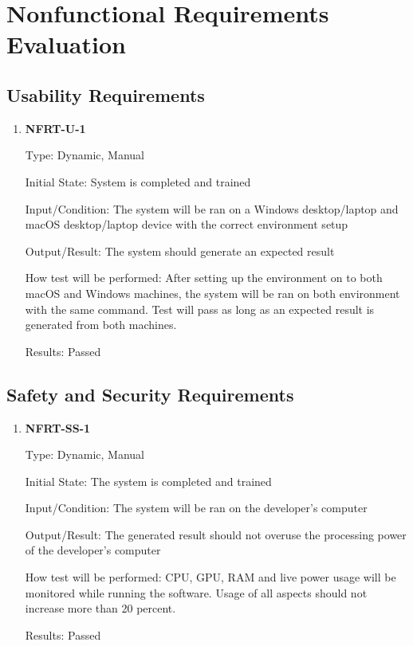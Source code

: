 \documentclass[12pt, titlepage]{article}
\begin{document}
\section{Nonfunctional Requirements Evaluation}

\subsection{Usability Requirements}

\begin{enumerate}

\item \textbf{NFRT-U-1}
    
Type: Dynamic, Manual
    					
Initial State: System is completed and trained
    					
Input/Condition: The system will be ran on a Windows desktop/laptop and macOS desktop/laptop device with the correct environment setup
    					
Output/Result: The system should generate an expected result 
    					
How test will be performed: After setting up the environment on to both macOS and Windows machines, the system will be ran on both environment with the same command. Test will pass as long as an expected result is generated from both machines.

Results: Passed
    
\end{enumerate}
		
\subsection{Safety and Security Requirements}

\begin{enumerate}

\item \textbf{NFRT-SS-1}

Type: Dynamic, Manual
					
Initial State: The system is completed and trained 
					
Input/Condition: The system will be ran on the developer's computer
					
Output/Result: The generated result should not overuse the processing power of the developer's computer
					
How test will be performed: CPU, GPU, RAM and live power usage will be monitored while running the software. Usage of all aspects should not increase more than 20 percent.   

Results: Passed
					
\end{enumerate}
\end{document}
